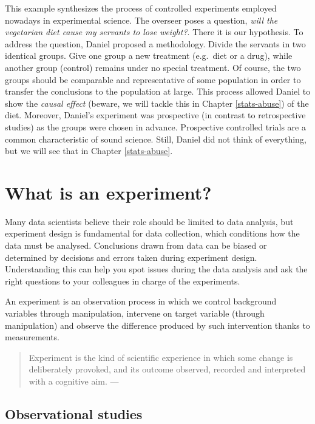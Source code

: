 \documentclass[
]{book}
\begin{document}
This example synthesizes the process of controlled experiments employed nowadays in experimental science. The overseer poses a question, \emph{will the vegetarian diet cause my servants to lose weight?}. There it is our hypothesis. To address the question, Daniel proposed a methodology. Divide the servants in two identical groups. Give one group a new treatment (e.g.~diet or a drug), while another group (control) remains under no special treatment. Of course, the two groups should be comparable and representative of some population in order to transfer the conclusions to the population at large. This process allowed Daniel to show the \emph{causal effect} (beware, we will tackle this in Chapter \ref{stats-abuse}) of the diet. Moreover, Daniel's experiment was prospective (in contrast to retrospective studies) as the groups were chosen in advance. Prospective controlled trials are a common characteristic of sound science. Still, Daniel did not think of everything, but we will see that in Chapter \ref{stats-abuse}.

\hypertarget{what-is-an-experiment}{%
\section{What is an experiment?}\label{what-is-an-experiment}}

Many data scientists believe their role should be limited to data analysis, but experiment design is fundamental for data collection, which conditions how the data must be analysed. Conclusions drawn from data can be biased or determined by decisions and errors taken during experiment design. Understanding this can help you spot issues during the data analysis and ask the right questions to your colleagues in charge of the experiments.

An experiment is an observation process in which we control background variables through manipulation, intervene on target variable (through manipulation) and observe the difference produced by such intervention thanks to measurements.

\begin{quote}
Experiment is the kind of scientific experience in which some change is deliberately provoked, and its outcome observed, recorded and interpreted with a cognitive aim. --- \citep{bunge2017philosophy}
\end{quote}

\hypertarget{observational-studies}{%
\subsection{Observational studies}\label{observational-studies}}
\end{document}
